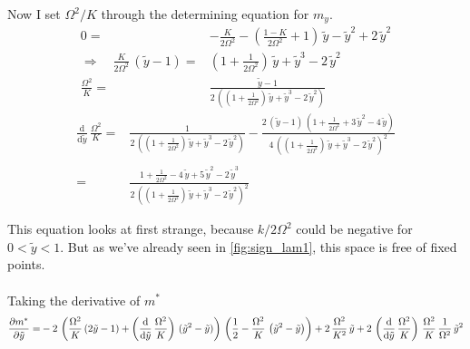 \documentclass{article}
\begin{document}
Now I set $\Omega^2/K$ through the determining equation for $m_y$.
\begin{align*}
    0=&-\frac{K}{2\Omega^2}-\left( \frac{1-K}{2\Omega^2} +1\right)\,\tilde{y}-\tilde{y}^2+2\,\tilde{y}^2\\
    \Rightarrow\quad \frac{K}{2\Omega^2}\,(\tilde{y}-1)=&(1+\frac{1}{2\Omega^2})\,\tilde{y}+\tilde{y}^3-2\,\tilde{y}^2\\
    \frac{\Omega^2}{K}=&\frac{\tilde{y}-1}{2\,\left(  (1+\frac{1}{2\Omega^2})\,\tilde{y}+\tilde{y}^3-2\,\tilde{y}^2\right)}
\end{align*}
\begin{align*}
    \frac{\text{d}}{\text{d}\tilde{y}}\,\frac{\Omega^2}{K}=&\frac{1}{2\,\left(  (1+\frac{1}{2\Omega^2})\,\tilde{y}+\tilde{y}^3-2\,\tilde{y}^2\right)}-\frac{2\,(\tilde{y}-1)\,(1+\frac{1}{2\Omega^2}+3\,\tilde{y}^2-4\,\tilde{y})}{4\,\left(  (1+\frac{1}{2\Omega^2})\,\tilde{y}+\tilde{y}^3-2\,\tilde{y}^2\right)^2}\\\\
    =&\frac{1+\frac{1}{2\Omega^2}-4\,\tilde{y}+5\,\tilde{y}^2-2\,\tilde{y}^3}{2\,\left(  (1+\frac{1}{2\Omega^2})\,\tilde{y}+\tilde{y}^3-2\,\tilde{y}^2\right)^2}
\end{align*}

This equation looks at first strange, because $k/2\Omega^2$ could be negative for $0<\tilde{y}<1$. But as we've already seen in \autoref{fig:sign_lam1}, this space is free of fixed points. \\\\
Taking the derivative of $m^*$
\begin{align*}
    \frac{\partial m^*}{\partial\tilde{y}}=&-2\,\left(\frac{\Omega^2}{K}\,(2\tilde{y}-1)+\left(\frac{\text{d}}{\text{d}\tilde{y}}\,\frac{\Omega^2}{K}\right)\,(\tilde{y}^2-\tilde{y})\right)\,\left( \frac{1}{2}-\frac{\Omega^2}{K}\,\left( \tilde{y}^2- \tilde{y} \right) \right)+2\,\frac{\Omega^2}{K^2}\,\tilde{y}+2\,\left(\frac{\text{d}}{\text{d}\tilde{y}}\,\frac{\Omega^2}{K}\right)\,\frac{\Omega^2}{K}\,\frac{1}{\Omega^2}\,\tilde{y}^2\\
\end{align*}
\end{document}
